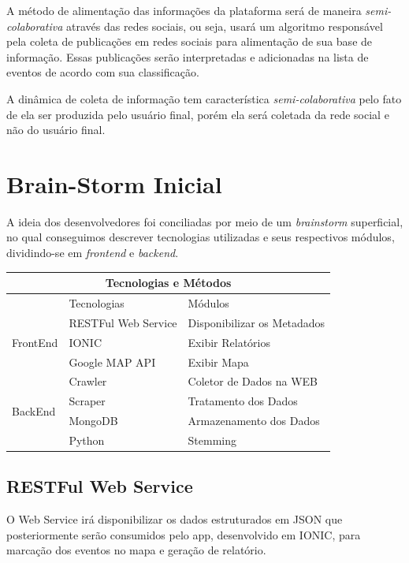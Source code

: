 \documentclass[
	12pt,				%
	openright,			%
	twoside,			%
	a4paper,			%
	english,			%
	french,				%
	spanish,			%
	brazil,				%
	]{abntex2}
\begin{document}
A método de alimentação das informações da plataforma será de maneira \textit{semi-colaborativa} através das redes sociais, ou seja, usará um algoritmo responsável pela coleta de publicações em redes sociais para alimentação de sua base de informação. Essas publicações serão interpretadas e adicionadas na lista de eventos de acordo com sua classificação.

A dinâmica de coleta de informação tem característica \textit{semi-colaborativa} pelo fato de ela ser produzida pelo usuário final, porém ela será coletada da rede social e não do usuário final.



\chapter{Brain-Storm Inicial}


A ideia dos desenvolvedores foi conciliadas por meio de um \textit{brainstorm} superficial, no qual conseguimos descrever tecnologias utilizadas e seus respectivos módulos, dividindo-se em \textit{frontend} e \textit{backend}.

\begin{center}
	\begin{tabular}{|l|l|l|}
		\hline
		\multicolumn{3}{|c|}{Tecnologias e Métodos} \\
		\hline
				 						& Tecnologias			& Módulos \\ \hline
		\multirow{3}{*}{FrontEnd} 		& RESTFul Web Service	& Disponibilizar os Metadados \\
										& IONIC 				& Exibir Relatórios\\
										& Google MAP API 		& Exibir Mapa\\ \hline
		\multirow{4}{*}{BackEnd}		& Crawler 				& Coletor de Dados na WEB\\
										& Scraper 				& Tratamento dos Dados \\
										& MongoDB 				& Armazenamento dos Dados \\
				 						& Python 				& Stemming \\ \hline
	\end{tabular}
\end{center}


\section*{RESTFul Web Service}

O Web Service irá disponibilizar os dados estruturados em JSON que posteriormente serão consumidos pelo app, desenvolvido em IONIC, para marcação dos eventos no mapa e geração de relatório.
\end{document}
